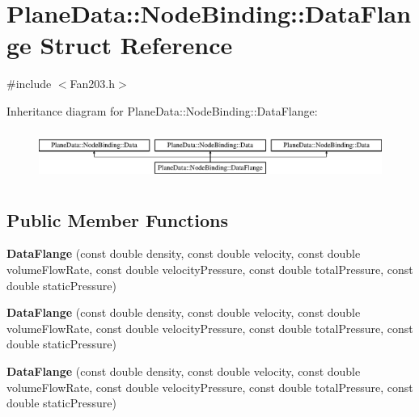\hypertarget{struct_plane_data_1_1_node_binding_1_1_data_flange}{}\section{Plane\+Data\+:\+:Node\+Binding\+:\+:Data\+Flange Struct Reference}
\label{struct_plane_data_1_1_node_binding_1_1_data_flange}


{\ttfamily \#include $<$Fan203.\+h$>$}

Inheritance diagram for Plane\+Data\+:\+:Node\+Binding\+:\+:Data\+Flange\+:\begin{figure}[H]
\begin{center}
\leavevmode
\includegraphics[height=1.644640cm]{d5/d92/struct_plane_data_1_1_node_binding_1_1_data_flange}
\end{center}
\end{figure}
\subsection*{Public Member Functions}
\begin{DoxyCompactItemize}
\item 
\mbox{\label{struct_plane_data_1_1_node_binding_1_1_data_flange_ab70d450f11914a68f121f32b58b11f29}} 
{\bfseries Data\+Flange} (const double density, const double velocity, const double volume\+Flow\+Rate, const double velocity\+Pressure, const double total\+Pressure, const double static\+Pressure)
\item 
\mbox{\label{struct_plane_data_1_1_node_binding_1_1_data_flange_ab70d450f11914a68f121f32b58b11f29}} 
{\bfseries Data\+Flange} (const double density, const double velocity, const double volume\+Flow\+Rate, const double velocity\+Pressure, const double total\+Pressure, const double static\+Pressure)
\item 
\mbox{\label{struct_plane_data_1_1_node_binding_1_1_data_flange_ab70d450f11914a68f121f32b58b11f29}} 
{\bfseries Data\+Flange} (const double density, const double velocity, const double volume\+Flow\+Rate, const double velocity\+Pressure, const double total\+Pressure, const double static\+Pressure)
\end{DoxyCompactItemize}
